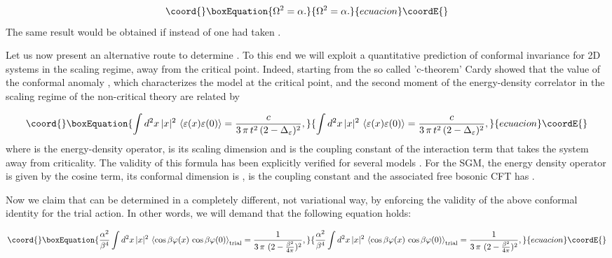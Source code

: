 \documentclass[a4paper,12pt]{article}
\begin{document}
\begin{equation}\coord{}\boxEquation{\label{SGGaussian}
\Omega^2=\alpha .
}{\Omega^2=\alpha .
}{ecuacion}\coordE{}\end{equation}
The same result would be obtained if instead of \myHighlight{$\rho=\Omega$}\coordHE{} one had taken
\myHighlight{$\rho=\sqrt{\alpha}$}\coordHE{}.

\vspace{.5cm}

Let us now present an alternative route to determine \myHighlight{$\Omega$}\coordHE{}. To this end we will
exploit a quantitative prediction of conformal invariance for 2D systems in the
scaling regime, away from the critical point. Indeed, starting from the so called
'c-theorem' \cite{Zamolodchikov} Cardy \cite{Cardy} showed that the value of the
conformal anomaly \coordHE{}, which characterizes the model at the critical point, and the
second moment of the energy-density correlator in the scaling regime of the
non-critical theory are related by

\begin{equation}\coord{}\boxEquation{ \label{Cardy}
\int d^2x\, |x|^2\, \bra\varepsilon(x)\varepsilon(0)\ket = \frac{c}{3\, \pi
\,t^2\,(2 - \Delta_\varepsilon)^2},
}{ \int d^2x\, |x|^2\, \bra\varepsilon(x)\varepsilon(0)\ket = \frac{c}{3\, \pi
\,t^2\,(2 - \Delta_\varepsilon)^2},
}{ecuacion}\coordE{}\end{equation}
where \myHighlight{$\varepsilon$}\coordHE{} is the energy-density operator, \myHighlight{$\Delta_\varepsilon$}\coordHE{} is its
scaling dimension and \coordHE{} is the coupling constant of the interaction
term that takes the system away from criticality. The validity of this formula has
been explicitly verified for several models \cite{Cardy} \cite{Cardy2} \cite{Naon}
\cite{Salvay}. For the SGM, the energy density operator is given by the cosine term,
its conformal dimension is \coordHE{}, \coordHE{} is the coupling
constant \coordHE{} and the associated free bosonic CFT has \coordHE{}.

Now we claim that \myHighlight{$\Omega$}\coordHE{} can be determined in a completely different, not
variational way, by enforcing the validity of the above conformal identity for the
trial action. In other words, we will demand that the following equation holds:

\begin{equation}\coord{}\boxEquation{ \label{Main}
\frac{\alpha^2}{\beta^4}\int d^2x\, |x|^2\, \bra
\cos\beta\varphi(x)\,\cos\beta\varphi(0) \ket\trial = \frac{1}{3\,
\pi \,\,(2 - \frac{\beta^2}{4\pi})^2},
}{ \frac{\alpha^2}{\beta^4}\int d^2x\, |x|^2\, \bra
\cos\beta\varphi(x)\,\cos\beta\varphi(0) \ket\trial = \frac{1}{3\,
\pi \,\,(2 - \frac{\beta^2}{4\pi})^2},
}{ecuacion}\coordE{}\end{equation}
\end{document}
